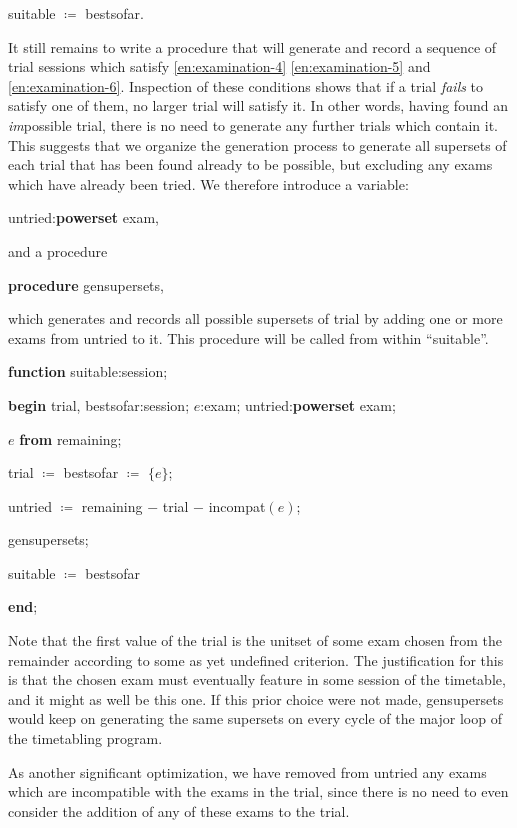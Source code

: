 \quad suitable $\coloneq$ bestsofar.

It still remains to write a procedure that will generate and record a sequence of trial sessions which satisfy \ref{en:examination-4} \ref{en:examination-5} and \ref{en:examination-6}. Inspection of these conditions shows that if a trial \textit{fails} to satisfy one of them, no larger trial will satisfy it. In other words, having found an \textit{im}possible trial, there is no need to generate any further trials which contain it. This suggests that we organize the generation process to generate all supersets of each trial that has been found already to be possible, but excluding any exams which have already been tried. We therefore introduce a variable:

\quad untried:\textbf{powerset} exam,

\noindent
and a procedure

\quad \textbf{procedure} gensupersets,

\noindent
which generates and records all possible supersets of trial by adding one or more exams from untried to it. This procedure will be called from within ``suitable''.

\quad \textbf{function} suitable:session;

\quad \quad \textbf{begin} trial, bestsofar:session; $e$:exam; untried:\textbf{powerset} exam;

\quad \quad \quad $e$ \textbf{from} remaining;

\quad \quad \quad trial $\coloneq$ bestsofar $\coloneq$ $\{e\}$;

\quad \quad \quad untried $\coloneq$ remaining $-$ trial $-$ incompat$(e)$;

\quad \quad \quad gensupersets;

\quad \quad \quad suitable $\coloneq$ bestsofar

\quad \quad \textbf{end};

\noindent
Note that the first value of the trial is the unitset of some exam chosen from the remainder according to some as yet undefined criterion. The justification for this is that the chosen exam must eventually feature in some session of the timetable, and it might as well be this one. If this prior choice were not made, gensupersets would keep on generating the same supersets on every cycle of the major loop of the timetabling program.

As another significant optimization, we have removed from untried any exams which are incompatible with the exams in the trial, since there is no need to even consider the addition of any of these exams to the trial.

